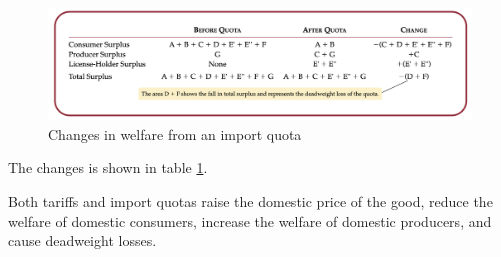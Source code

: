 \begin{figure}[!ht]
  \centering
  \includegraphics[width=\textwidth]{pics/changes-in-welfare-from-an-import-quota}
  \caption{Changes in welfare from an import quota}
  \label{fig:changes-in-welfare-from-an-import-quota}
\end{figure}

The changes is shown in table \ref{fig:changes-in-welfare-from-an-import-quota}.


Both tariffs and import quotas raise the domestic price of the good, reduce the welfare of domestic consumers, increase the welfare of domestic producers, and cause deadweight losses.






